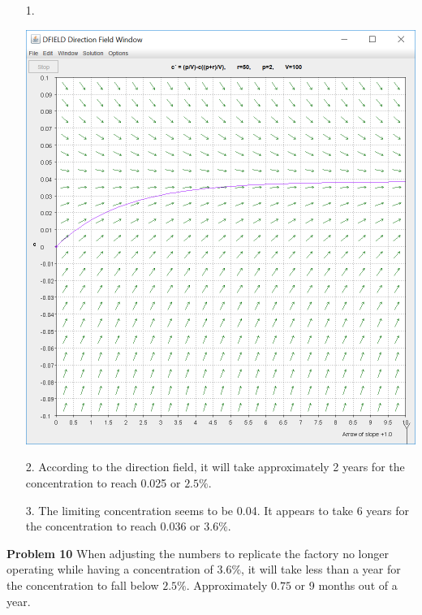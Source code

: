 \documentclass[10pt]{article}
\begin{document}
            \begin{enumerate}
                \item[1.]    \\ \begin{center}\includegraphics[scale=0.5]{lab1p3p9.PNG}\end{center}
                \item[2.] According to the direction field, it will take approximately 2 years for the concentration to reach 0.025 or $2.5\%$.
                \item[3.] The limiting concentration seems to be 0.04. It appears to take 6 years for the concentration to reach $0.036$ or $3.6\%$. 
            \end{enumerate}
        {\bf Problem 10} When adjusting the numbers to replicate the factory no longer operating while having a concentration of $3.6\%$, it will take less than a year for the concentration to fall below $2.5\%$. Approximately $0.75$ or 9 months out of a year.
\end{document}
